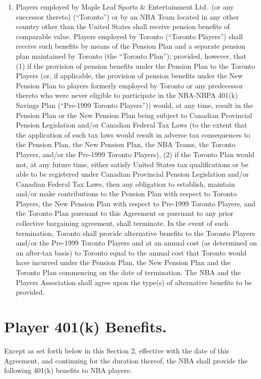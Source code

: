 \documentclass[
]{book}
\begin{document}
\begin{enumerate}
\item
  Players employed by Maple Leaf Sports \& Entertainment Ltd.~(or any successor thereto) (``Toronto'') or by an NBA Team located in any other country other than the United States shall receive pension benefits of comparable value. Players employed by Toronto (``Toronto Players'') shall receive such benefits by means of the Pension Plan and a separate pension plan maintained by Toronto (the ``Toronto Plan''); provided, however, that (1) if the provision of pension benefits under the Pension Plan to the Toronto Players (or, if applicable, the provision of pension benefits under the New Pension Plan to players formerly employed by Toronto or any predecessor thereto who were never eligible to participate in the NBA-NBPA 401(k) Savings Plan (``Pre-1999 Toronto Players'')) would, at any time, result in the Pension Plan or the New Pension Plan being subject to Canadian Provincial Pension Legislation and/or Canadian Federal Tax Laws (to the extent that the application of such tax laws would result in adverse tax consequences to the Pension Plan, the New Pension Plan, the NBA Teams, the Toronto Players, and/or the Pre-1999 Toronto Players), (2) if the Toronto Plan would not, at any future time, either satisfy United States tax qualifications or be able to be registered under Canadian Provincial Pension Legislation and/or Canadian Federal Tax Laws, then any obligation to establish, maintain and/or make contributions to the Pension Plan with respect to Toronto Players, the New Pension Plan with respect to Pre-1999 Toronto Players, and the Toronto Plan pursuant to this Agreement or pursuant to any prior collective bargaining agreement, shall terminate. In the event of such termination, Toronto shall provide alternative benefits to the Toronto Players and/or the Pre-1999 Toronto Players and at an annual cost (as determined on an after-tax basis) to Toronto equal to the annual cost that Toronto would have incurred under the Pension Plan, the New Pension Plan and the Toronto Plan commencing on the date of termination. The NBA and the Players Association shall agree upon the type(s) of alternative benefits to be provided.
\end{enumerate}

\hypertarget{player-401k-benefits.}{%
\section{Player 401(k) Benefits.}\label{player-401k-benefits.}}

Except as set forth below in this Section 2, effective with the date of this Agreement, and continuing for the duration thereof, the NBA shall provide the following 401(k) benefits to NBA players:
\end{document}
